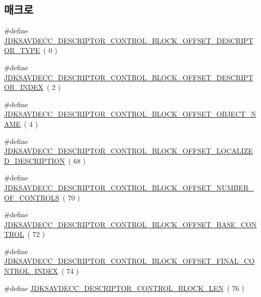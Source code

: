 \subsection*{매크로}
\begin{DoxyCompactItemize}
\item 
\#define \hyperlink{group__descriptor__control__block_gac2f9214cae285eb7d5e5a52d6ac52161}{J\+D\+K\+S\+A\+V\+D\+E\+C\+C\+\_\+\+D\+E\+S\+C\+R\+I\+P\+T\+O\+R\+\_\+\+C\+O\+N\+T\+R\+O\+L\+\_\+\+B\+L\+O\+C\+K\+\_\+\+O\+F\+F\+S\+E\+T\+\_\+\+D\+E\+S\+C\+R\+I\+P\+T\+O\+R\+\_\+\+T\+Y\+PE}~( 0 )
\item 
\#define \hyperlink{group__descriptor__control__block_gaf019aebb8212d11727cca9ab7ba97fee}{J\+D\+K\+S\+A\+V\+D\+E\+C\+C\+\_\+\+D\+E\+S\+C\+R\+I\+P\+T\+O\+R\+\_\+\+C\+O\+N\+T\+R\+O\+L\+\_\+\+B\+L\+O\+C\+K\+\_\+\+O\+F\+F\+S\+E\+T\+\_\+\+D\+E\+S\+C\+R\+I\+P\+T\+O\+R\+\_\+\+I\+N\+D\+EX}~( 2 )
\item 
\#define \hyperlink{group__descriptor__control__block_gaebcea2353f454de51260f008a1ffb659}{J\+D\+K\+S\+A\+V\+D\+E\+C\+C\+\_\+\+D\+E\+S\+C\+R\+I\+P\+T\+O\+R\+\_\+\+C\+O\+N\+T\+R\+O\+L\+\_\+\+B\+L\+O\+C\+K\+\_\+\+O\+F\+F\+S\+E\+T\+\_\+\+O\+B\+J\+E\+C\+T\+\_\+\+N\+A\+ME}~( 4 )
\item 
\#define \hyperlink{group__descriptor__control__block_gacdbc28935fb5a09c58368b4bff827a04}{J\+D\+K\+S\+A\+V\+D\+E\+C\+C\+\_\+\+D\+E\+S\+C\+R\+I\+P\+T\+O\+R\+\_\+\+C\+O\+N\+T\+R\+O\+L\+\_\+\+B\+L\+O\+C\+K\+\_\+\+O\+F\+F\+S\+E\+T\+\_\+\+L\+O\+C\+A\+L\+I\+Z\+E\+D\+\_\+\+D\+E\+S\+C\+R\+I\+P\+T\+I\+ON}~( 68 )
\item 
\#define \hyperlink{group__descriptor__control__block_ga03012c995b2ed5b34d05b22a3990f802}{J\+D\+K\+S\+A\+V\+D\+E\+C\+C\+\_\+\+D\+E\+S\+C\+R\+I\+P\+T\+O\+R\+\_\+\+C\+O\+N\+T\+R\+O\+L\+\_\+\+B\+L\+O\+C\+K\+\_\+\+O\+F\+F\+S\+E\+T\+\_\+\+N\+U\+M\+B\+E\+R\+\_\+\+O\+F\+\_\+\+C\+O\+N\+T\+R\+O\+LS}~( 70 )
\item 
\#define \hyperlink{group__descriptor__control__block_gab2953043860b016448ef33b396c9e528}{J\+D\+K\+S\+A\+V\+D\+E\+C\+C\+\_\+\+D\+E\+S\+C\+R\+I\+P\+T\+O\+R\+\_\+\+C\+O\+N\+T\+R\+O\+L\+\_\+\+B\+L\+O\+C\+K\+\_\+\+O\+F\+F\+S\+E\+T\+\_\+\+B\+A\+S\+E\+\_\+\+C\+O\+N\+T\+R\+OL}~( 72 )
\item 
\#define \hyperlink{group__descriptor__control__block_gaec0d897187168a8fb117d9dac11ad3e5}{J\+D\+K\+S\+A\+V\+D\+E\+C\+C\+\_\+\+D\+E\+S\+C\+R\+I\+P\+T\+O\+R\+\_\+\+C\+O\+N\+T\+R\+O\+L\+\_\+\+B\+L\+O\+C\+K\+\_\+\+O\+F\+F\+S\+E\+T\+\_\+\+F\+I\+N\+A\+L\+\_\+\+C\+O\+N\+T\+R\+O\+L\+\_\+\+I\+N\+D\+EX}~( 74 )
\item 
\#define \hyperlink{group__descriptor__control__block_gaff7f491436a268217f239cfe713a71c4}{J\+D\+K\+S\+A\+V\+D\+E\+C\+C\+\_\+\+D\+E\+S\+C\+R\+I\+P\+T\+O\+R\+\_\+\+C\+O\+N\+T\+R\+O\+L\+\_\+\+B\+L\+O\+C\+K\+\_\+\+L\+EN}~( 76 )
\end{DoxyCompactItemize}
